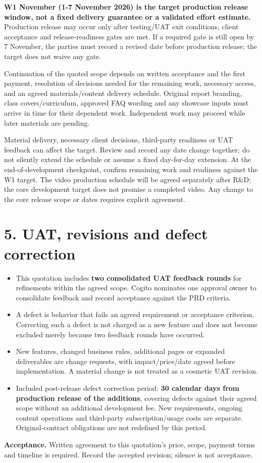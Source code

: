 \documentclass[11pt,a4paper]{article}
\providecommand{\tightlist}{\setlength{\itemsep}{0pt}\setlength{\parskip}{0pt}}
\begin{document}
\textbf{W1 November (1-7 November 2026) is the target production release window, not a fixed delivery guarantee or a validated effort estimate.} Production release may occur only after testing/UAT exit conditions, client acceptance and release-readiness gates are met. If a required gate is still open by 7 November, the parties must record a revised date before production release; the target does not waive any gate.

Continuation of the quoted scope depends on written acceptance and the first payment, resolution of decisions needed for the remaining work, necessary access, and an agreed materials/content delivery schedule. Original report branding, class covers/curriculum, approved FAQ wording and any showcase inputs must arrive in time for their dependent work. Independent work may proceed while later materials are pending.

Material delivery, necessary client decisions, third-party readiness or UAT feedback can affect the target. Review and record any date change together; do not silently extend the schedule or assume a fixed day-for-day extension. At the end-of-development checkpoint, confirm remaining work and readiness against the W1 target. The video production schedule will be agreed separately after R\&D; the core development target does not promise a completed video. Any change to the core release scope or dates requires explicit agreement.

\section{5. UAT, revisions and defect correction}\label{uat-revisions-and-defect-correction}

\begin{itemize}
\tightlist
\item
  This quotation includes \textbf{two consolidated UAT feedback rounds} for refinements within the agreed scope. Cogito nominates one approval owner to consolidate feedback and record acceptance against the PRD criteria.
\item
  A defect is behavior that fails an agreed requirement or acceptance criterion. Correcting such a defect is not charged as a new feature and does not become excluded merely because two feedback rounds have occurred.
\item
  New features, changed business rules, additional pages or expanded deliverables are change requests, with impact/price/date agreed before implementation. A material change is not treated as a cosmetic UAT revision.
\item
  Included post-release defect correction period: \textbf{30 calendar days from production release of the additions}, covering defects against their agreed scope without an additional development fee. New requirements, ongoing content operations and third-party subscription/usage costs are separate. Original-contract obligations are not redefined by this period.
\end{itemize}

\textbf{Acceptance.} Written agreement to this quotation’s price, scope, payment terms and timeline is required. Record the accepted revision; silence is not acceptance.
\end{document}
